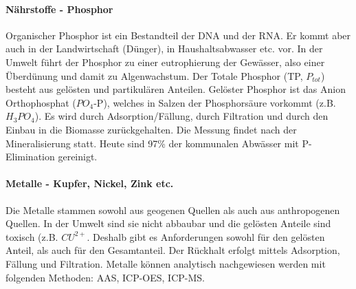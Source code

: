 \documentclass[9pt, openright=false]{scrartcl}
\begin{document}
\paragraph{Nährstoffe - Phosphor} Organischer Phosphor ist ein Bestandteil der DNA und der RNA. Er kommt aber auch in der Landwirtschaft (Dünger), in Haushaltsabwasser etc. vor. In der Umwelt führt der Phosphor zu einer eutrophierung der Gewässer, also einer Überdünung und damit zu Algenwachstum. Der Totale Phosphor (TP, $P_{tot}$) besteht aus gelösten und partikulären Anteilen. Gelöster Phosphor ist das Anion Orthophosphat ($PO_4$-P), welches in Salzen der Phosphorsäure vorkommt (z.B. $H_3PO_4$). Es wird durch Adsorption/Fällung, durch Filtration und durch den Einbau in die Biomasse zurückgehalten. Die Messung findet nach der Mineralisierung statt. Heute sind 97\% der kommunalen Abwässer mit P-Elimination gereinigt. 
\paragraph{Metalle - Kupfer, Nickel, Zink etc.} Die Metalle stammen sowohl aus geogenen Quellen als auch aus anthropogenen Quellen. In der Umwelt sind sie nicht abbaubar und die gelösten Anteile sind toxisch (z.B. $CU^{2+}$. Deshalb gibt es Anforderungen sowohl für den gelösten Anteil, als auch für den Gesamtanteil. Der Rückhalt erfolgt mittels Adsorption, Fällung und Filtration. Metalle können analytisch nachgewiesen werden mit folgenden Methoden:  AAS,  ICP-OES, ICP-MS.
\end{document}
